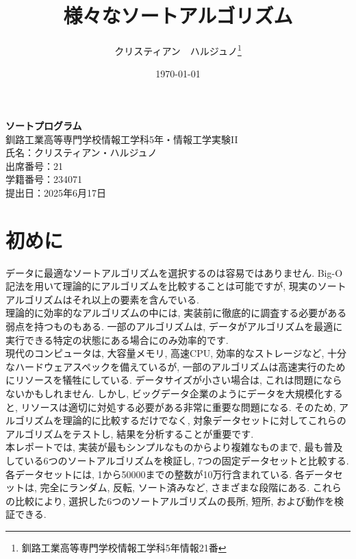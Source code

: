 \documentclass[a4j, 12pt]{jarticle}
\title{様々なソートアルゴリズム}
\author{クリスティアン　ハルジュノ\thanks{釧路工業高等専門学校情報工学科5年情報21番}}
\date{\today}
\begin{document}
\begin{titlepage}
  \centering
  \vspace*{3cm}

  {\fontsize{25pt}{36pt}\selectfont\bfseries ソートプログラム} \\[1cm]  %
  {\Large 釧路工業高等専門学校情報工学科5年・情報工学実験II} \\[1cm]
  {\large 氏名：クリスティアン・ハルジュノ} \\[1cm]
  {\large 出席番号：21} \\[1cm]
  {\large 学籍番号：234071} \\[5cm]


  {\Large 提出日：2025年6月17日} \\

  \vfill

\end{titlepage}
\tableofcontents
\newpage
\setcounter{page}{1}
\section{初めに}
データに最適なソートアルゴリズムを選択するのは容易ではありません. Big-O記法を用いて理論的にアルゴリズムを比較することは可能ですが, 現実のソートアルゴリズムはそれ以上の要素を含んでいる. \\

理論的に効率的なアルゴリズムの中には, 実装前に徹底的に調査する必要がある弱点を持つものもある. 一部のアルゴリズムは, データがアルゴリズムを最適に実行できる特定の状態にある場合にのみ効率的です. \\

現代のコンピュータは, 大容量メモリ, 高速CPU, 効率的なストレージなど, 十分なハードウェアスペックを備えているが, 一部のアルゴリズムは高速実行のためにリソースを犠牲にしている. データサイズが小さい場合は, これは問題にならないかもしれません. しかし, ビッグデータ企業のようにデータを大規模化すると, リソースは適切に対処する必要がある非常に重要な問題になる. そのため, アルゴリズムを理論的に比較するだけでなく, 対象データセットに対してこれらのアルゴリズムをテストし, 結果を分析することが重要です. \\

本レポートでは, 実装が最もシンプルなものからより複雑なものまで, 最も普及している6つのソートアルゴリズムを検証し, 7つの固定データセットと比較する. 各データセットには, 1から50000までの整数が10万行含まれている. 各データセットは, 完全にランダム, 反転, ソート済みなど, さまざまな段階にある. これらの比較により, 選択した6つのソートアルゴリズムの長所, 短所, および動作を検証できる. \\
\end{document}
